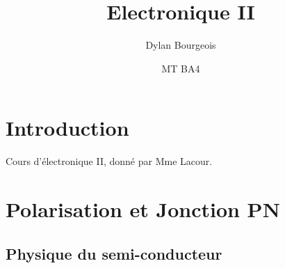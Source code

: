 \documentclass[]{article}
\begin{document}
\title{Electronique II}
\author{Dylan Bourgeois}
\date{MT BA4}
\maketitle

\section{Introduction}
Cours d'électronique II, donné par Mme Lacour.

\section{Polarisation et Jonction PN}
\subsection{Physique du semi-conducteur}
\end{document}

